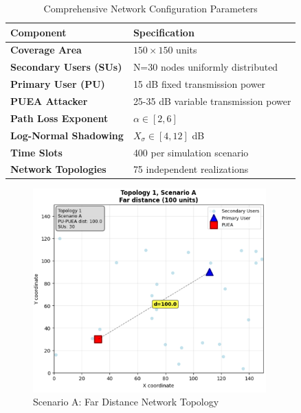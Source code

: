 \documentclass[pdflatex,sn-mathphys-num]{sn-jnl}%
\theoremstyle{thmstyleone}
\theoremstyle{thmstyletwo}
\theoremstyle{thmstylethree}
\begin{document}
\begin{table}[!t]
\renewcommand{\arraystretch}{1.3}

\centering
\begin{tabular}{|l|l|}
\toprule
\textbf{Component} & \textbf{Specification} \\
\midrule
\textbf{Coverage Area} & $150 \times 150$ units \\
\midrule
\textbf{Secondary Users (SUs)} & N=30 nodes uniformly distributed \\
\midrule
\textbf{Primary User (PU)} & 15 dB fixed transmission power \\
\midrule
\textbf{PUEA Attacker} & 25-35 dB variable transmission power \\
\midrule
\textbf{Path Loss Exponent} & $\alpha \in [2,6]$ \\
\midrule
\textbf{Log-Normal Shadowing} & $X_{\sigma} \in [4,12]$ dB \\
\midrule
\textbf{Time Slots} & 400 per simulation scenario \\
\midrule
\textbf{Network Topologies} & 75 independent realizations \\
\bottomrule
\end{tabular}
\vspace{0.2cm}
\caption{Comprehensive Network Configuration Parameters}
\label{tab:network_components}
\end{table}

\begin{figure}[!t]
\centering
\includegraphics[width=0.8\textwidth]{figures/scenario A system model.png}
\caption{Scenario A: Far Distance Network Topology}
\label{fig:scenario_A}
\end{figure}
\end{document}
